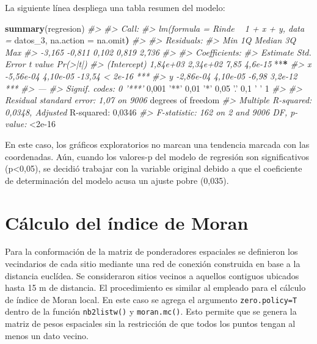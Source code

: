 \documentclass[11pt,b5paper,]{krantz}
\newenvironment{Shaded}{}{}
\newcommand{\CommentTok}[1]{\textcolor[rgb]{0.38,0.63,0.69}{\textit{#1}}}
\newcommand{\DecValTok}[1]{\textcolor[rgb]{0.25,0.63,0.44}{#1}}
\newcommand{\ErrorTok}[1]{\textcolor[rgb]{1.00,0.00,0.00}{\textbf{#1}}}
\newcommand{\FloatTok}[1]{\textcolor[rgb]{0.25,0.63,0.44}{#1}}
\newcommand{\KeywordTok}[1]{\textcolor[rgb]{0.00,0.44,0.13}{\textbf{#1}}}
\newcommand{\NormalTok}[1]{#1}
\newcommand{\OperatorTok}[1]{\textcolor[rgb]{0.40,0.40,0.40}{#1}}
\newcommand{\StringTok}[1]{\textcolor[rgb]{0.25,0.44,0.63}{#1}}
\begin{document}
La siguiente línea despliega una tabla resumen del modelo:

\begin{Shaded}
\begin{Highlighting}[]
\KeywordTok{summary}\NormalTok{(regresion)}
\CommentTok{#>}
\CommentTok{#> Call:}
\CommentTok{#> lm(formula = Rinde ~ 1 + x + y, data =}
\NormalTok{datos_}\DecValTok{3}\NormalTok{, na.action =}\StringTok{ }\NormalTok{na.omit}\ErrorTok{)}
\CommentTok{#>}
\CommentTok{#> Residuals:}
\CommentTok{#> Min 1Q Median 3Q Max}
\CommentTok{#> -3,165 -0,811 0,102 0,819 2,736}
\CommentTok{#>}
\CommentTok{#> Coefficients:}
\CommentTok{#> Estimate Std. Error t value Pr(>|t|)}
\CommentTok{#> (Intercept) 1,84e+03 2,34e+02 7,85 4,6e-15}
\OperatorTok{**}\ErrorTok{*}
\CommentTok{#> x -5,56e-04 4,10e-05 -13,54 < 2e-16 ***}
\CommentTok{#> y -2,86e-04 4,10e-05 -6,98 3,2e-12 ***}
\CommentTok{#> ---}
\CommentTok{#> Signif. codes: 0 '***'}
\StringTok{    }\DecValTok{0}\NormalTok{,}\DecValTok{001} \StringTok{'**'}
    \DecValTok{0}\NormalTok{,}\DecValTok{01} \StringTok{'*'}
\DecValTok{0}\NormalTok{,}\DecValTok{05} \StringTok{'.'}
    \DecValTok{0}\NormalTok{,}\DecValTok{1} \StringTok{'}
\StringTok{    '}
    \DecValTok{1}
\CommentTok{#>}
\CommentTok{#> Residual standard error: 1,07 on 9006}
\NormalTok{degrees of freedom}
\CommentTok{#> Multiple R-squared: 0,0348, Adjusted}
\NormalTok{R}\OperatorTok{-}\NormalTok{squared}\OperatorTok{:}\StringTok{ }\DecValTok{0}\NormalTok{,}\DecValTok{0346}
\CommentTok{#> F-statistic: 162 on 2 and 9006 DF, p-value:}
\OperatorTok{<}\FloatTok{2e-16}
\end{Highlighting}
\end{Shaded}

En este caso, los gráficos exploratorios no marcan una tendencia marcada con las coordenadas. Aún, cuando los valores-p del modelo de regresión son significativos (p\textless{}0,05), se decidió trabajar con la variable original debido a que el coeficiente de determinación del modelo acusa un ajuste pobre (0,035).

\hypertarget{cuxe1lculo-del-uxedndice-de-moran}{%
\section{Cálculo del índice de Moran}\label{cuxe1lculo-del-uxedndice-de-moran}}

Para la conformación de la matriz de ponderadores espaciales se definieron los vecindarios de cada sitio mediante una red de conexión construida en base a la distancia euclídea. Se consideraron sitios vecinos a aquellos contiguos ubicados hasta 15 m de distancia. El procedimiento es similar al empleado para el cálculo de índice de Moran local. En este caso se agrega el argumento \texttt{zero.policy=T} dentro de la función \texttt{nb2listw()} y \texttt{moran.mc()}. Esto permite que se genera la matriz de pesos espaciales sin la restricción de que todos los puntos tengan al menos un dato vecino.
\end{document}
